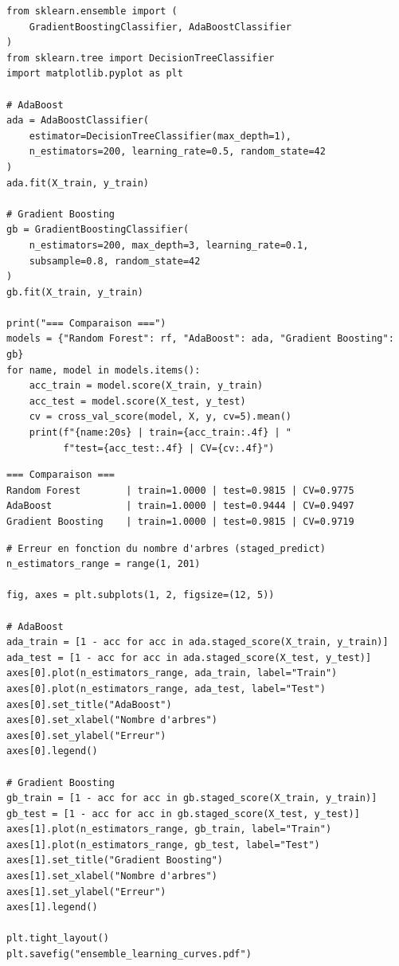 \begin{codeblock}[title=\textbf{Gradient Boosting et comparaison}]
\begin{verbatim}
from sklearn.ensemble import (
    GradientBoostingClassifier, AdaBoostClassifier
)
from sklearn.tree import DecisionTreeClassifier
import matplotlib.pyplot as plt

# AdaBoost
ada = AdaBoostClassifier(
    estimator=DecisionTreeClassifier(max_depth=1),
    n_estimators=200, learning_rate=0.5, random_state=42
)
ada.fit(X_train, y_train)

# Gradient Boosting
gb = GradientBoostingClassifier(
    n_estimators=200, max_depth=3, learning_rate=0.1,
    subsample=0.8, random_state=42
)
gb.fit(X_train, y_train)

print("=== Comparaison ===")
models = {"Random Forest": rf, "AdaBoost": ada, "Gradient Boosting": gb}
for name, model in models.items():
    acc_train = model.score(X_train, y_train)
    acc_test = model.score(X_test, y_test)
    cv = cross_val_score(model, X, y, cv=5).mean()
    print(f"{name:20s} | train={acc_train:.4f} | "
          f"test={acc_test:.4f} | CV={cv:.4f}")
\end{verbatim}
\end{codeblock}

\begin{codeoutput}
\begin{verbatim}
=== Comparaison ===
Random Forest        | train=1.0000 | test=0.9815 | CV=0.9775
AdaBoost             | train=1.0000 | test=0.9444 | CV=0.9497
Gradient Boosting    | train=1.0000 | test=0.9815 | CV=0.9719
\end{verbatim}
\end{codeoutput}

\begin{codeblock}[title=\textbf{Courbes d'apprentissage et effet du nombre d'arbres}]
\begin{verbatim}
# Erreur en fonction du nombre d'arbres (staged_predict)
n_estimators_range = range(1, 201)

fig, axes = plt.subplots(1, 2, figsize=(12, 5))

# AdaBoost
ada_train = [1 - acc for acc in ada.staged_score(X_train, y_train)]
ada_test = [1 - acc for acc in ada.staged_score(X_test, y_test)]
axes[0].plot(n_estimators_range, ada_train, label="Train")
axes[0].plot(n_estimators_range, ada_test, label="Test")
axes[0].set_title("AdaBoost")
axes[0].set_xlabel("Nombre d'arbres")
axes[0].set_ylabel("Erreur")
axes[0].legend()

# Gradient Boosting
gb_train = [1 - acc for acc in gb.staged_score(X_train, y_train)]
gb_test = [1 - acc for acc in gb.staged_score(X_test, y_test)]
axes[1].plot(n_estimators_range, gb_train, label="Train")
axes[1].plot(n_estimators_range, gb_test, label="Test")
axes[1].set_title("Gradient Boosting")
axes[1].set_xlabel("Nombre d'arbres")
axes[1].set_ylabel("Erreur")
axes[1].legend()

plt.tight_layout()
plt.savefig("ensemble_learning_curves.pdf")
\end{verbatim}
\end{codeblock}

